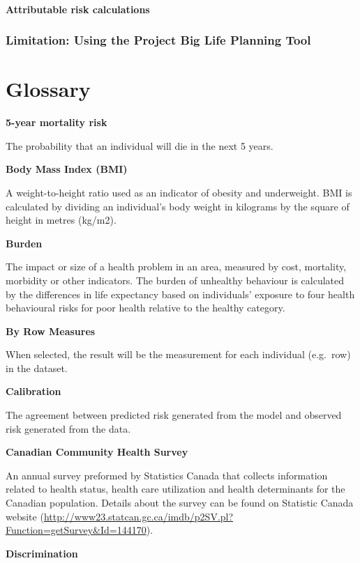 \documentclass[]{book}
\begin{document}
\subsubsection{Attributable risk
calculations}\label{attributable-risk-calculations}

\subsection{Limitation: Using the Project Big Life Planning
Tool}\label{limitation-using-the-project-big-life-planning-tool}

\chapter{Glossary}\label{glossary}

\textbf{5-year mortality risk}

The probability that an individual will die in the next 5 years.

\textbf{Body Mass Index (BMI)}

A weight-to-height ratio used as an indicator of obesity and
underweight. BMI is calculated by dividing an individual's body weight
in kilograms by the square of height in metres (kg/m2).

\textbf{Burden}

The impact or size of a health problem in an area, measured by cost,
mortality, morbidity or other indicators. The burden of unhealthy
behaviour is calculated by the differences in life expectancy based on
individuals' exposure to four health behavioural risks for poor health
relative to the healthy category.

\textbf{By Row Measures}

When selected, the result will be the measurement for
each individual (e.g.~row) in the dataset.

\textbf{Calibration}

The agreement between predicted risk generated from the model and
observed risk generated from the data.

\textbf{Canadian Community Health Survey}

An annual survey preformed by Statistics Canada that collects
information related to health status, health care utilization and health
determinants for the Canadian population. Details about the survey can
be found on Statistic Canada website
(\url{http://www23.statcan.gc.ca/imdb/p2SV.pl?Function=getSurvey\&Id=144170}).

\textbf{Discrimination}
\end{document}
